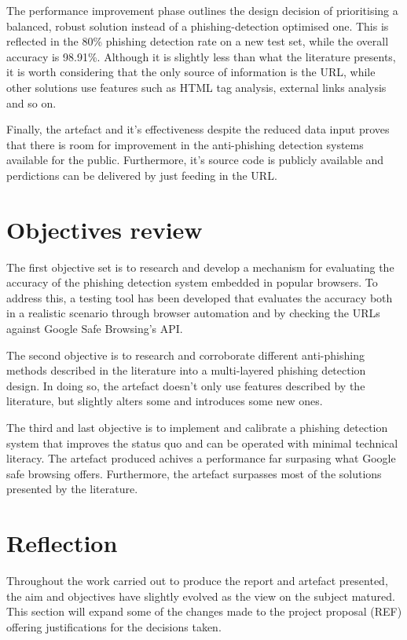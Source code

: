 The performance improvement phase outlines the design decision of prioritising a balanced, robust solution instead of a phishing-detection optimised one. This is reflected in the 80\% phishing detection rate on a new test set, while the overall accuracy is 98.91\%. Although it is slightly less than what the literature presents, it is worth considering that the only source of information is the URL, while other solutions use features such as HTML tag analysis, external links analysis and so on.

Finally, the artefact and it's effectiveness despite the reduced data input proves that there is room for improvement in the anti-phishing detection systems available for the public. Furthermore, it's source code is publicly available and perdictions can be delivered by just feeding in the URL.

\section{Objectives review}
The first objective set is to research and develop a mechanism for evaluating the accuracy of the phishing detection system embedded in popular browsers. To address this, a testing tool has been developed that evaluates the accuracy both in a realistic scenario through browser automation and by checking the URLs against Google Safe Browsing's API.

The second objective is to research and corroborate different anti-phishing methods described in the literature into a multi-layered phishing detection design. In doing so, the artefact doesn't only use features described by the literature, but slightly alters some and introduces some new ones. 

The third and last objective is to implement and calibrate a phishing detection system that improves the status quo and can be operated with minimal technical literacy. The artefact produced achives a performance far surpasing what Google safe browsing offers. Furthermore, the artefact surpasses most of the solutions presented by the literature.

\section{Reflection}
Throughout the work carried out to produce the report and artefact presented, the aim and objectives have slightly evolved as the view on the subject matured. This section will expand some of the changes made to the project proposal (REF) offering justifications for the decisions taken.

